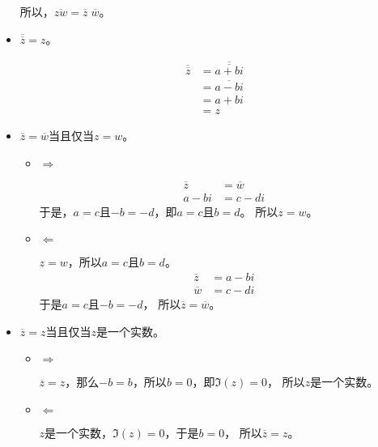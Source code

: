 \documentclass{article}
\begin{document}
\begin{itemize}
        所以，$\overline{zw} = \overline{z} \; \overline{w}$。

  \item $\overline{\overline{z}} = z$。

        \begin{align*}
          \overline{\overline{z}} & = \overline{\overline{a + bi}} \\
                                  & = \overline{a - bi}            \\
                                  & = a + bi                       \\
                                  & = z
        \end{align*}

  \item $\overline{z} = \overline{w}$当且仅当$z = w$。

        \begin{itemize}
          \item $\Rightarrow$

                \begin{align*}
                  \overline{z} & = \overline{w} \\
                  a - bi       & = c - di
                \end{align*}
                于是，$a = c$且$-b = -d$，即$a = c$且$b = d$。
                所以$z = w$。

          \item $\Leftarrow$

                $z = w$，所以$a = c$且$b = d$。
                \begin{align*}
                  \overline{z} & = a - bi \\
                  \overline{w} & = c - di
                \end{align*}
                于是$a = c$且$-b = -d$，
                所以$\overline{z} = \overline{w}$。
        \end{itemize}

  \item $\overline{z} = z$当且仅当$z$是一个实数。
        \begin{itemize}
          \item $\Rightarrow$

                $\overline{z} = z$，那么$-b = b$，所以$b = 0$，即$\mathfrak{I}(z) = 0$，
                所以$z$是一个实数。

          \item $\Leftarrow$

                $z$是一个实数，$\mathfrak{I}(z) = 0$，于是$b = 0$，
                所以$\overline{z} = z$。
        \end{itemize}

\end{itemize}
\end{document}
